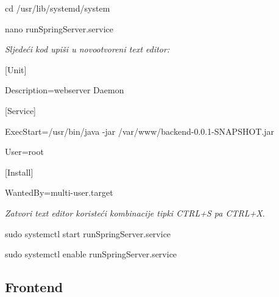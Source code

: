                \begin{packed_item}
        			\item {cd /usr/lib/systemd/system}
        			\item {nano runSpringServer.service}
        			\item \textit{Sljedeći kod upiši u novootvoreni text editor:}
        			\item {[Unit]}
                    \item {Description=webserver Daemon}
                    \item {[Service]}
                    \item {ExecStart=/usr/bin/java -jar /var/www/backend-0.0.1-SNAPSHOT.jar}
                    \item {User=root}
                    \item {[Install]}
                    \item {WantedBy=multi-user.target}
        			\item \textit{Zatvori text editor koristeći kombinacije tipki CTRL+S pa CTRL+X.}
        			\item {sudo systemctl start runSpringServer.service}
        			\item {sudo systemctl enable runSpringServer.service}
        		\end{packed_item}

            \subsection{Frontend}

                {}
			
			\eject 